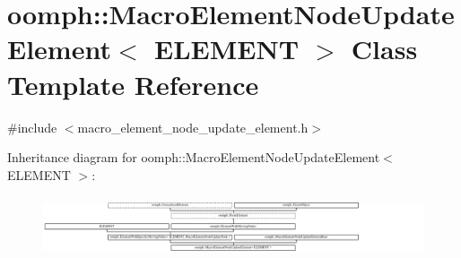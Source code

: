 \hypertarget{classoomph_1_1MacroElementNodeUpdateElement}{}\section{oomph\+:\+:Macro\+Element\+Node\+Update\+Element$<$ E\+L\+E\+M\+E\+NT $>$ Class Template Reference}
\label{classoomph_1_1MacroElementNodeUpdateElement}


{\ttfamily \#include $<$macro\+\_\+element\+\_\+node\+\_\+update\+\_\+element.\+h$>$}

Inheritance diagram for oomph\+:\+:Macro\+Element\+Node\+Update\+Element$<$ E\+L\+E\+M\+E\+NT $>$\+:\begin{figure}[H]
\begin{center}
\leavevmode
\includegraphics[height=1.774398cm]{classoomph_1_1MacroElementNodeUpdateElement}
\end{center}
\end{figure}
